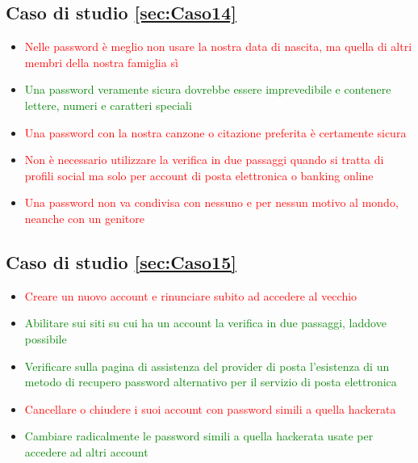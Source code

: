 \documentclass{article}
\begin{document}
\subsection{Caso di studio \ref{sec:Caso14}}
\begin{itemize}
	\item \textcolor{red}{Nelle password è meglio non usare la nostra data di nascita, ma quella di altri membri della nostra famiglia sì}	
	\item \textcolor{green}{Una password veramente sicura dovrebbe essere imprevedibile e contenere lettere, numeri e caratteri speciali}	
	\item \textcolor{red}{Una password con la nostra canzone o citazione preferita è certamente sicura}
	\item \textcolor{red}{Non è necessario utilizzare la verifica in due passaggi quando si tratta di profili social ma solo per account di posta elettronica o banking online}
	\item \textcolor{red}{Una password non va condivisa con nessuno e per nessun motivo al mondo, neanche con un genitore}
\end{itemize}
\subsection{Caso di studio \ref{sec:Caso15}}
\begin{itemize}
	\item \textcolor{red}{Creare un nuovo account e rinunciare subito ad accedere al vecchio}	
	\item \textcolor{green}{Abilitare sui siti su cui ha un account la verifica in due passaggi, laddove possibile}
	\item \textcolor{green}{Verificare sulla pagina di assistenza del provider di posta l’esistenza di un metodo di recupero password alternativo per il servizio di posta elettronica}
	\item \textcolor{red}{Cancellare o chiudere i suoi account con password simili a quella hackerata}
	\item \textcolor{green}{Cambiare radicalmente le password simili a quella hackerata usate per accedere ad altri account}
\end{itemize}
\end{document}
